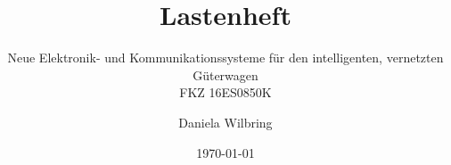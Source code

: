 \documentclass[11pt,a4paper,parskip]{scrartcl}
\author{Daniela Wilbring}
\title{Lastenheft}
\subtitle{Neue Elektronik- und Kommunikationssysteme für den intelligenten, vernetzten Güterwagen\\FKZ 16ES0850K}
\date{\today}
\begin{document}
\maketitle \newpage
\tableofcontents \newpage
\\
%
%
\appendix


\end{document}
